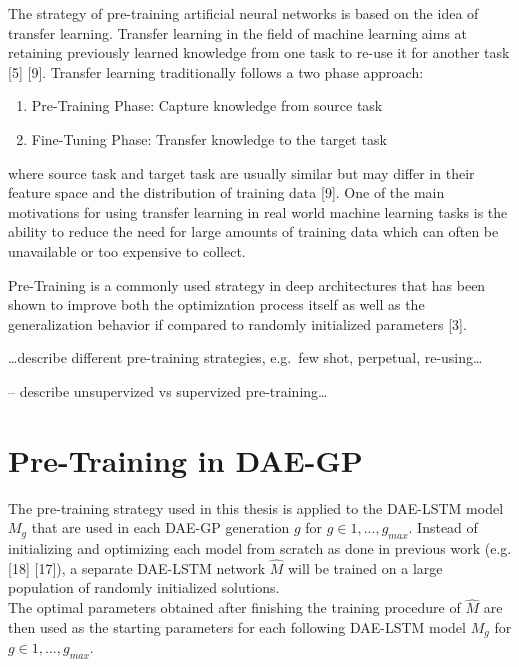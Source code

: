 \documentclass[
  11pt,
]{article}
\providecommand{\tightlist}{%
  \setlength{\itemsep}{0pt}\setlength{\parskip}{0pt}}
\begin{document}
The strategy of pre-training artificial neural networks is based on the
idea of transfer learning. Transfer learning in the field of machine
learning aims at retaining previously learned knowledge from one task to
re-use it for another task {[}5{]} {[}9{]}. Transfer learning
traditionally follows a two phase approach:

\begin{enumerate}
\def\labelenumi{\arabic{enumi}.}
\tightlist
\item
  Pre-Training Phase: Capture knowledge from source task
\item
  Fine-Tuning Phase: Transfer knowledge to the target task
\end{enumerate}

where source task and target task are usually similar but may differ in
their feature space and the distribution of training data {[}9{]}. One
of the main motivations for using transfer learning in real world
machine learning tasks is the ability to reduce the need for large
amounts of training data which can often be unavailable or too expensive
to collect.

Pre-Training is a commonly used strategy in deep architectures that has
been shown to improve both the optimization process itself as well as
the generalization behavior if compared to randomly initialized
parameters {[}3{]}.

\ldots describe different pre-training strategies, e.g.~few shot,
perpetual, re-using\ldots{}

-- describe unsupervized vs supervized pre-training\ldots{}

\hypertarget{pre-training-in-dae-gp}{%
\section{Pre-Training in DAE-GP}\label{pre-training-in-dae-gp}}

The pre-training strategy used in this thesis is applied to the DAE-LSTM
model \(M_g\) that are used in each DAE-GP generation \(g\) for
\(g\in{1,...,g_{max}}\). Instead of initializing and optimizing each
model from scratch as done in previous work (e.g. {[}18{]} {[}17{]}), a
separate DAE-LSTM network \(\hat{M}\) will be trained on a large
population of randomly initialized solutions.\\
The optimal parameters obtained after finishing the training procedure
of \(\hat{M}\) are then used as the starting parameters for each
following DAE-LSTM model \(M_g\) for \(g\in{1,...,g_{max}}\).
\end{document}

